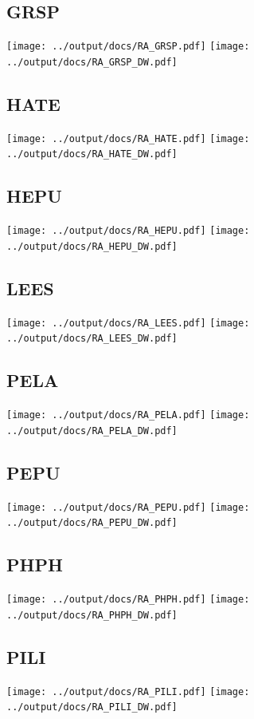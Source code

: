 \documentclass[10pt]{book} %
\begin{document}
\clearpage
\newpage
\subsection{GRSP}
\texttt{[image: ../output/docs/RA\_GRSP.pdf]}
{\center\texttt{[image: ../output/docs/RA\_GRSP\_DW.pdf]}}

\clearpage
\newpage
\subsection{HATE}
\texttt{[image: ../output/docs/RA\_HATE.pdf]}
{\center\texttt{[image: ../output/docs/RA\_HATE\_DW.pdf]}}

\clearpage
\newpage
\subsection{HEPU}
\texttt{[image: ../output/docs/RA\_HEPU.pdf]}
{\center\texttt{[image: ../output/docs/RA\_HEPU\_DW.pdf]}}

\clearpage
\newpage
\subsection{LEES}
\texttt{[image: ../output/docs/RA\_LEES.pdf]}
{\center\texttt{[image: ../output/docs/RA\_LEES\_DW.pdf]}}

\clearpage
\newpage
\subsection{PELA}
\texttt{[image: ../output/docs/RA\_PELA.pdf]}
{\center\texttt{[image: ../output/docs/RA\_PELA\_DW.pdf]}}

\clearpage
\newpage
\subsection{PEPU}
\texttt{[image: ../output/docs/RA\_PEPU.pdf]}
{\center\texttt{[image: ../output/docs/RA\_PEPU\_DW.pdf]}}

\clearpage
\newpage
\subsection{PHPH}
\texttt{[image: ../output/docs/RA\_PHPH.pdf]}
{\center\texttt{[image: ../output/docs/RA\_PHPH\_DW.pdf]}}

\clearpage
\newpage
\subsection{PILI}
\texttt{[image: ../output/docs/RA\_PILI.pdf]}
{\center\texttt{[image: ../output/docs/RA\_PILI\_DW.pdf]}}
\end{document}
